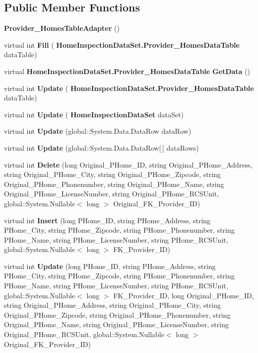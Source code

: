 \subsection*{Public Member Functions}
\begin{DoxyCompactItemize}
\item 
\textbf{ Provider\+\_\+\+Homes\+Table\+Adapter} ()
\item 
virtual int \textbf{ Fill} (\textbf{ Home\+Inspection\+Data\+Set.\+Provider\+\_\+\+Homes\+Data\+Table} data\+Table)
\item 
virtual \textbf{ Home\+Inspection\+Data\+Set.\+Provider\+\_\+\+Homes\+Data\+Table} \textbf{ Get\+Data} ()
\item 
virtual int \textbf{ Update} (\textbf{ Home\+Inspection\+Data\+Set.\+Provider\+\_\+\+Homes\+Data\+Table} data\+Table)
\item 
virtual int \textbf{ Update} (\textbf{ Home\+Inspection\+Data\+Set} data\+Set)
\item 
virtual int \textbf{ Update} (global\+::\+System.\+Data.\+Data\+Row data\+Row)
\item 
virtual int \textbf{ Update} (global\+::\+System.\+Data.\+Data\+Row[$\,$] data\+Rows)
\item 
virtual int \textbf{ Delete} (long Original\+\_\+\+P\+Home\+\_\+\+ID, string Original\+\_\+\+P\+Home\+\_\+\+Address, string Original\+\_\+\+P\+Home\+\_\+\+City, string Original\+\_\+\+P\+Home\+\_\+\+Zipcode, string Original\+\_\+\+P\+Home\+\_\+\+Phonenumber, string Original\+\_\+\+P\+Home\+\_\+\+Name, string Original\+\_\+\+P\+Home\+\_\+\+License\+Number, string Original\+\_\+\+P\+Home\+\_\+\+R\+C\+S\+Unit, global\+::\+System.\+Nullable$<$ long $>$ Original\+\_\+\+F\+K\+\_\+\+Provider\+\_\+\+ID)
\item 
virtual int \textbf{ Insert} (long P\+Home\+\_\+\+ID, string P\+Home\+\_\+\+Address, string P\+Home\+\_\+\+City, string P\+Home\+\_\+\+Zipcode, string P\+Home\+\_\+\+Phonenumber, string P\+Home\+\_\+\+Name, string P\+Home\+\_\+\+License\+Number, string P\+Home\+\_\+\+R\+C\+S\+Unit, global\+::\+System.\+Nullable$<$ long $>$ F\+K\+\_\+\+Provider\+\_\+\+ID)
\item 
virtual int \textbf{ Update} (long P\+Home\+\_\+\+ID, string P\+Home\+\_\+\+Address, string P\+Home\+\_\+\+City, string P\+Home\+\_\+\+Zipcode, string P\+Home\+\_\+\+Phonenumber, string P\+Home\+\_\+\+Name, string P\+Home\+\_\+\+License\+Number, string P\+Home\+\_\+\+R\+C\+S\+Unit, global\+::\+System.\+Nullable$<$ long $>$ F\+K\+\_\+\+Provider\+\_\+\+ID, long Original\+\_\+\+P\+Home\+\_\+\+ID, string Original\+\_\+\+P\+Home\+\_\+\+Address, string Original\+\_\+\+P\+Home\+\_\+\+City, string Original\+\_\+\+P\+Home\+\_\+\+Zipcode, string Original\+\_\+\+P\+Home\+\_\+\+Phonenumber, string Original\+\_\+\+P\+Home\+\_\+\+Name, string Original\+\_\+\+P\+Home\+\_\+\+License\+Number, string Original\+\_\+\+P\+Home\+\_\+\+R\+C\+S\+Unit, global\+::\+System.\+Nullable$<$ long $>$ Original\+\_\+\+F\+K\+\_\+\+Provider\+\_\+\+ID)

\end{DoxyCompactItemize}
